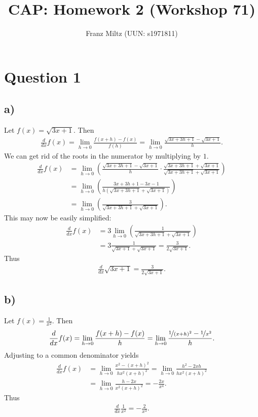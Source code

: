 \documentclass{article}
\title{CAP: Homework 2 (Workshop 71)}
\author{Franz Miltz (UUN: s1971811)}
\begin{document}
\maketitle
\section*{Question 1}
\subsection*{a)}
Let $f(x)=\sqrt{3x+1}$. Then
\begin{align*}
  \frac{d}{dx}f(x)=\lim_{h\to0}\frac{f(x+h)-f(x)}{f(h)}
  =\lim_{h\to0}\frac{\sqrt{3x+3h+1}-\sqrt{3x+1}}{h}.
\end{align*}
We can get rid of the roots in the numerator by multiplying by $1$.
\begin{align*}
  \frac{d}{dx}f(x) & =\lim_{h\to0}\left(\frac{\sqrt{3x+3h+1}-\sqrt{3x+1}}{h}\cdot\frac{\sqrt{3x+3h+1}+\sqrt{3x+1}}{\sqrt{3x+3h+1}+\sqrt{3x+1}}\right) \\
                   & =\lim_{h\to0}\left(\frac{3x+3h+1-3x-1}{h(\sqrt{3x+3h+1}+\sqrt{3x+1})}\right)                                                     \\
                   & =\lim_{h\to0}\left(\frac{3}{\sqrt{3x+3h+1}+\sqrt{3x+1}}\right).
\end{align*}
This may now be easily simplified:
\begin{align*}
  \frac{d}{dx}f(x) & = 3\lim_{h\to0}\left(\frac{1}{\sqrt{3x+3h+1}+\sqrt{3x+1}}\right) \\
                   & =3\frac{1}{\sqrt{3x+1}+\sqrt{3x+1}}=\frac{3}{2\sqrt{3x+1}}.
\end{align*}
Thus
\begin{align*}
  \frac{d}{dx}\sqrt{3x+1}=\frac{3}{2\sqrt{3x+1}}.
\end{align*}
\subsection*{b)}
Let $f(x)=\frac{1}{x^2}$. Then
\begin{align*}
  \frac{d}{dx}f(x)=\lim_{h\to0}\frac{f(x+h)-f(x)}{h}=\lim_{h\to0}\frac{\nicefrac{1}{(x+h)^2}-\nicefrac{1}{x^2}}{h}.
\end{align*}
Adjusting to a common denominator yields
\begin{align*}
  \frac{d}{dx}f(x) & =\lim_{h\to0}\frac{x^2-(x+h)^2}{hx^2(x+h)^2}
  =\lim_{h\to0}\frac{h^2-2xh}{hx^2(x+h)^2}                                 \\
                   & =\lim_{h\to0}\frac{h-2x}{x^2(x+h)^2}=-\frac{2x}{x^4}.
\end{align*}
Thus
\begin{align*}
  \frac{d}{dx}\frac{1}{x^2}=-\frac{2}{x^3}.
\end{align*}
\end{document}
